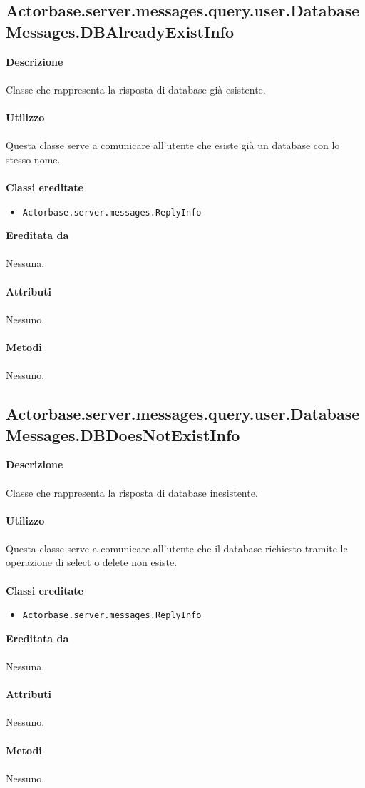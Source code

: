 \documentclass[a4paper]{article}
\begin{document}
	\subsection{Actorbase.server.messages.query.user.DatabaseMessages.DBAlreadyExistInfo}
		\textbf{Descrizione}
			\\ \\
		Classe che rappresenta la risposta di database già esistente.
			\\ \\
		\textbf{Utilizzo}
			\\ \\
		Questa classe serve a comunicare all'utente che esiste già un database con lo stesso nome.
			\\ \\
		\textbf{Classi ereditate}
			\begin{itemize}
				\item \texttt{Actorbase.server.messages.ReplyInfo }
			\end{itemize}
		\textbf{Ereditata da}
			\\ \\
			Nessuna.
			\\ \\
		\textbf{Attributi}
			\\ \\
			Nessuno.
			\\ \\
		\textbf{Metodi }
			\\ \\
			Nessuno.
			
	\subsection{Actorbase.server.messages.query.user.DatabaseMessages.DBDoesNotExistInfo}
		\textbf{Descrizione}
			\\ \\
		Classe che rappresenta la risposta di database inesistente.
			\\ \\
		\textbf{Utilizzo}
			\\ \\
		Questa classe serve a comunicare all'utente che il database richiesto tramite le operazione di select o delete non esiste.
			\\ \\
		\textbf{Classi ereditate}
			\begin{itemize}
				\item \texttt{Actorbase.server.messages.ReplyInfo }
			\end{itemize}
		\textbf{Ereditata da}
			\\ \\
			Nessuna.
			\\ \\
		\textbf{Attributi}
			\\ \\
			Nessuno.
			\\ \\
		\textbf{Metodi }
			\\ \\
			Nessuno.
			
\end{document}
